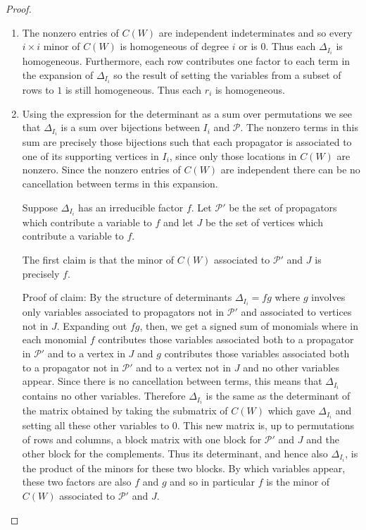 \documentclass[11pt]{article}
\theoremstyle{remark}
\theoremstyle{definition}
\begin{document}
\begin{proof}
\begin{enumerate}
    \item The nonzero entries of $C(W)$ are independent indeterminates and so every $i\times i$ minor of $C(W)$ is homogeneous of degree $i$ or is $0$.  Thus each $\Delta_{I_i}$ is homogeneous.  Furthermore, each row contributes one factor to each term in the expansion of $\Delta_{I_i}$ so the result of setting the variables from a subset of rows to $1$ is still homogeneous.  Thus each $r_i$ is homogeneous.
    \item Using the expression for the determinant as a sum over permutations we see that $\Delta_{I_i}$ is a sum over bijections between $I_i$ and $\mathcal{P}$.  The nonzero terms in this sum are precisely those bijections such that each propagator is associated to one of its supporting vertices in $I_i$, since only those locations in $C(W)$ are nonzero.  Since the nonzero entries of $C(W)$ are independent there can be no cancellation between terms in this expansion.

Suppose $\Delta_{I_i}$ has an irreducible factor $f$.  Let $\mathcal{P}'$ be the set of propagators which contribute a variable to $f$ and let $J$ be the set of vertices which contribute a variable to $f$.

The first claim is that the minor of $C(W)$ associated to $\mathcal{P}'$ and $J$ is precisely $f$.

Proof of claim: By the structure of determinants $\Delta_{I_i} = fg$ where $g$ involves only variables associated to propagators not in $\mathcal{P}'$ and associated to vertices not in $J$.  Expanding out $fg$, then, we get a signed sum of monomials where in each monomial $f$ contributes those variables associated both to a propagator in $\mathcal{P}'$ and to a vertex in $J$ and $g$ contributes those variables associated both to a propagator not in $\mathcal{P}'$ and to a vertex not in $J$ and no other variables appear.  Since there is no cancellation between terms, this means that $\Delta_{I_i}$ contains no other variables.  Therefore $\Delta_{I_i}$ is the same as the determinant of the matrix obtained by taking the submatrix of $C(W)$ which gave $\Delta_{I_i}$ and setting all these other variables to $0$.  This new matrix is, up to permutations of rows and columns, a block matrix with one block for $\mathcal{P}'$ and $J$ and the other block for the complements.  Thus its determinant, and hence also $\Delta_{I_i}$, is the product of the minors for these two blocks.  By which variables appear, these two factors are also $f$ and $g$ and so in particular $f$ is the minor of $C(W)$ associated to $\mathcal{P}'$ and $J$.


\end{enumerate}
\end{proof}
\end{document}
